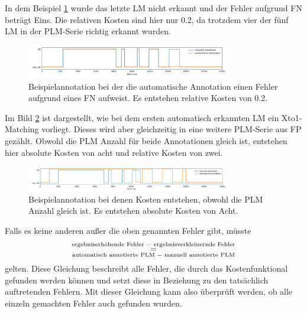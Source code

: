 In dem Beispiel \ref{fig:0.2Kost} wurde das letzte LM nicht erkannt und der Fehler aufgrund \gls{FN} beträgt Eins. Die relativen Kosten sind hier nur 0.2, da trotzdem vier der fünf LM in der PLM-Serie richtig erkannt wurden.


\begin{figure}[!ht]%
	\begin{center}
	\includegraphics[width=0.80\textwidth]{./Bilder/0.2Kost.jpg}
	\end{center}
	\caption{Beispielannotation bei der die automatische Annotation einen Fehler aufgrund eines FN aufweist. Es entstehen relative Kosten von 0.2.}%
	\label{fig:0.2Kost}%
\end{figure}

Im Bild \ref{fig:achtKost} ist dargestellt, wie bei dem ersten automatisch erkannten LM ein Xto1-Matching vorliegt. Dieses wird aber gleichzeitig in eine weitere PLM-Serie aus FP gezählt. Obwohl die PLM Anzahl für beide Annotationen gleich ist, entstehen hier absolute Kosten von acht und relative Kosten von zwei. 

\begin{figure}[!ht]%
	\begin{center}
	\includegraphics[width=0.80\textwidth]{./Bilder/underovercount.jpg}
	\end{center}
	\caption{Beispielannotation bei denen Kosten entstehen, obwohl die PLM Anzahl gleich ist. Es entstehen absolute Kosten von Acht.}%
	\label{fig:achtKost}%
\end{figure}




Falls es keine anderen außer die oben genannten Fehler gibt, müsste
\begin{equation}
\overset{\text{ergebniserhöhende Fehler \textminus \ ergebnisverkleinernde Fehler}}{\underset{\text{automatisch annotierte PLM \textminus \ manuell annotierte PLM}}{=}}
\label{kdiff}\end{equation}
gelten. Diese Gleichung beschreibt alle Fehler, die durch das Kostenfunktional gefunden werden können und setzt diese in Beziehung zu den tatsächlich auftretenden Fehlern. Mit dieser Gleichung kann also überprüft werden, ob alle einzeln gemachten Fehler auch gefunden wurden.

